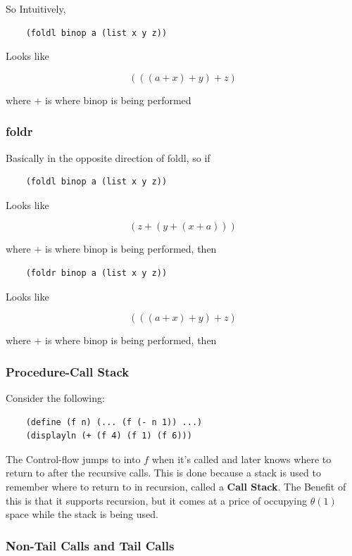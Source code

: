\documentclass[12pt]{article}
\begin{document}
So Intuitively,

\begin{lstlisting}
	(foldl binop a (list x y z))
\end{lstlisting}

Looks like

$$(((a + x) + y) + z)$$

where $+$ is where binop is being performed

\subsubsection{foldr}

Basically in the opposite direction of foldl, so if

\begin{lstlisting}
	(foldl binop a (list x y z))
\end{lstlisting}

Looks like

$$(z + (y + (x+a)))$$

where $+$ is where binop is being performed, then

\begin{lstlisting}
	(foldr binop a (list x y z))
\end{lstlisting}

Looks like

$$(((a + x) + y) + z)$$

where $+$ is where binop is being performed, then

\subsubsection{Procedure-Call Stack}

Consider the following:

\begin{lstlisting}
	(define (f n) (... (f (- n 1)) ...)
	(displayln (+ (f 4) (f 1) (f 6)))
\end{lstlisting}

The Control-flow jumps to into $f$ when it's called and later knows where to return to after the recursive calls. This is done because a stack is used to remember where to return to in recursion, called a \textbf{Call Stack}. The Benefit of this is that it supports recursion, but it comes at a price of occupying $\theta (1)$ space while the stack is being used.

\subsubsection{Non-Tail Calls and Tail Calls}
\end{document}

